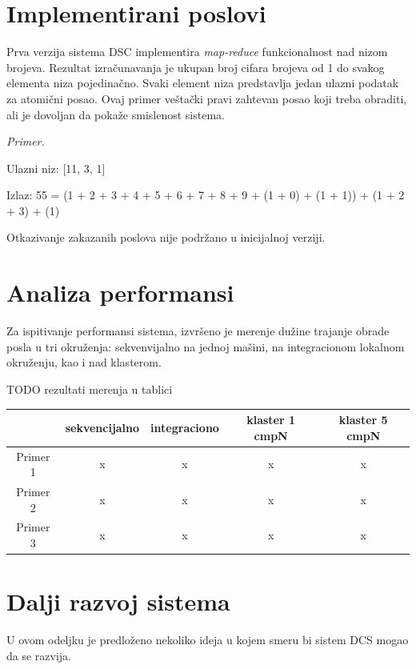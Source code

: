 \documentclass[12pt,oneside]{memoir}
\begin{document}
\section{Implementirani poslovi}

Prva verzija sistema DSC implementira \emph{map-reduce} funkcionalnost nad nizom brojeva. Rezultat izračunavanja je ukupan broj cifara brojeva od 1 do svakog elementa niza pojedinačno. Svaki element niza predstavlja jedan ulazni podatak za atomični posao. Ovaj primer veštački pravi zahtevan posao koji treba obraditi, ali je dovoljan da pokaže smislenost sistema.

\emph{Primer.}

Ulazni niz: [11, 3, 1]

Izlaz: 55 = (1 + 2 + 3 + 4 + 5 + 6 + 7 + 8 + 9 + (1 + 0) + (1 + 1)) + (1 + 2 + 3) + (1)

Otkazivanje zakazanih poslova nije podržano u inicijalnoj verziji.


\section{Analiza performansi}

Za ispitivanje performansi sistema, izvršeno je merenje dužine trajanje obrade posla u tri okruženja: sekvenvijalno na jednoj mašini, na integracionom lokalnom okruženju, kao i nad klasterom.

TODO rezultati merenja u tablici

\begin{center}
\begin{tabular}{ |c||c|c|c|c| } 
 \hline
  & sekvencijalno & integraciono & klaster 1 cmpN & klaster 5 cmpN \\ 
 \hline
 Primer 1 & x & x & x & x \\ 
 Primer 2 & x & x & x & x \\ 
 Primer 3 & x & x & x & x \\ 
 \hline
\end{tabular}
\end{center}

\section{Dalji razvoj sistema}

U ovom odeljku je predloženo nekoliko ideja u kojem smeru bi sistem DCS mogao da se razvija.
\end{document}
